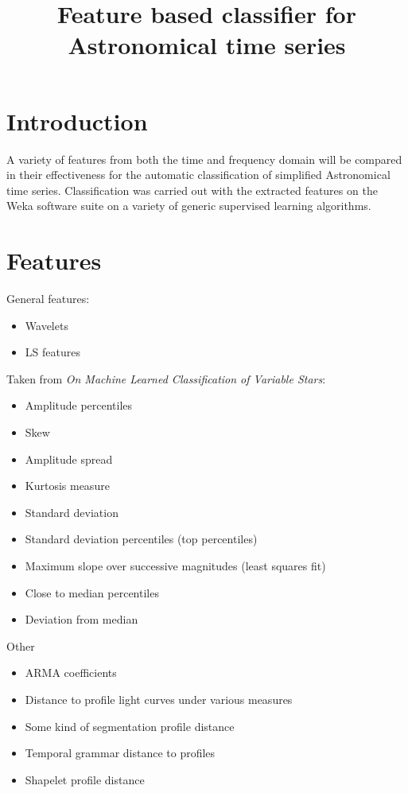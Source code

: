 \documentclass[10pt]{report}
\title{Feature based classifier for Astronomical time series}
\date{}
\begin{document}
	\maketitle
	
	\section{Introduction}
	A variety of features from both the time and frequency domain will be compared in their effectiveness for the automatic classification of simplified Astronomical time series. Classification was carried out with the extracted features on the Weka software suite on a variety of generic supervised learning algorithms.
	
	\section{Features}
	General features:
	\begin{itemize}
		\item Wavelets
		\item LS features
	\end{itemize}
	Taken from \emph{On Machine Learned Classification of Variable Stars}:
	\begin{itemize}
		\item Amplitude percentiles
		\item Skew
		\item Amplitude spread
		\item Kurtosis measure
		\item Standard deviation
		\item Standard deviation percentiles (top percentiles)
		\item Maximum slope over successive magnitudes (least squares fit)
		\item Close to median percentiles
		\item Deviation from median 
	\end{itemize}
	Other
	\begin{itemize}
		\item ARMA coefficients
		\item Distance to profile light curves under various measures
		\item Some kind of segmentation profile distance
		\item Temporal grammar distance to profiles
		\item Shapelet profile distance
	\end{itemize}
			
\end{document}
